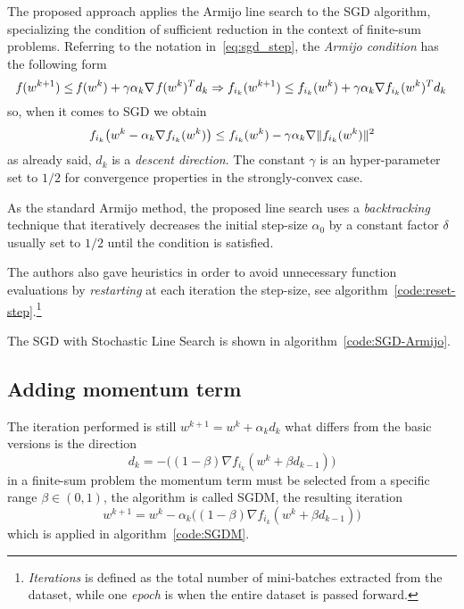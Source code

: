 The proposed approach applies the Armijo line search to the SGD algorithm, specializing the condition of sufficient reduction in the context of finite-sum problems. Referring to the notation in~\eqref{eq:sgd_step}, the \emph{Armijo condition} has the following form
\[
\operatorname*{\mathit{f}}(w^{k+1})\leq\operatorname*{\mathit{f}}(w^k)+\gamma\alpha_k\nabla\operatorname*{\mathit{f}}(w^k)^Td_k\Rightarrow
f_{i_k}(w^{k+1})\leq f_{i_k}(w^k)+\gamma\alpha_k\nabla f_{i_k}(w^k)^Td_k
\]
so, when it comes to SGD we obtain
\begin{equation}\label{eq:armijo-sls}
f_{i_k}\bigl(w^k-\alpha_k\nabla f_{i_k}(w^k)\bigr)\leq f_{i_k}(w^k)-\gamma\alpha_k\nabla\lVert f_{i_k}(w^k)\rVert^2
\end{equation}
as already said, $d_k$ is a \emph{descent direction}. The constant $\gamma$ is an hyper-parameter set to $1/2$ for convergence properties in the strongly-convex case.

As the standard Armijo method, the proposed line search uses a \emph{backtracking} technique that iteratively decreases the initial step-size $\alpha_0$ by a constant factor $\delta$ usually set to $1/2$ until the condition is satisfied.

The authors also gave heuristics in order to avoid unnecessary function evaluations by \emph{restarting} at each iteration the step-size, see algorithm~\vref{code:reset-step}.\footnote{\emph{Iterations} is defined as the total number of mini-batches extracted from the dataset, while one \emph{epoch} is when the entire dataset is passed forward.}

The SGD with Stochastic Line Search is shown in algorithm~\vref{code:SGD-Armijo}.

\subsection{Adding momentum term}

The iteration performed is still $w^{k+1}=w^k+\alpha_kd_k$ what differs from the basic versions is the direction
\[
d_k=-\bigl((1-\beta)\nabla f_{i_k}(w^k+\beta d_{k-1})\bigr)
\]
in a finite-sum problem the momentum term must be selected from a specific range $\beta\in(0,1)$, the algorithm is called SGDM, the resulting iteration
\begin{equation}\label{eq:sgdm-step}
w^{k+1}=w^k-\alpha_k\bigl((1-\beta)\nabla f_{i_k}(w^k+\beta d_{k-1})\bigr)
\end{equation}
which is applied in algorithm~\vref{code:SGDM}.

